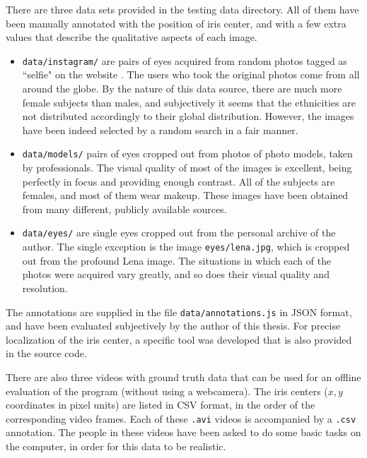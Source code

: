 There are three data sets provided in the testing data directory.
All of them have been manually annotated with the position of iris center, and with a few extra values that describe the qualitative aspects of each image.

\begin{itemize}
\item {\tt data/instagram/} are pairs of eyes acquired from random photos tagged as ``selfie" on the website .
The users who took the original photos come from all around the globe.
By the nature of this data source, there are much more female subjects than males, and subjectively it seems that the ethnicities are not distributed accordingly to their global distribution.
However, the images have been indeed selected by a random search in a fair manner.

\item {\tt data/models/} pairs of eyes cropped out from photos of photo models, taken by professionals.
The visual quality of most of the images is excellent, being perfectly in focus and providing enough contrast.
All of the subjects are females, and most of them wear makeup.
These images have been obtained from many different, publicly available sources.

\item {\tt data/eyes/} are single eyes cropped out from the personal archive of the author.
The single exception is the image {\tt eyes/lena.jpg}, which is cropped out from the profound Lena image.
The situations in which each of the photos were acquired vary greatly, and so does their visual quality and resolution.
\end{itemize}

The annotations are supplied in the file {\tt data/annotations.js} in JSON format, and have been evaluated subjectively by the author of this thesis.
For precise localization of the iris center, a specific tool was developed that is also provided in the source code.

There are also three videos with ground truth data that can be used for an offline evaluation of the program (without using a webcamera).
The iris centers ($x, y$ coordinates in pixel units) are listed in CSV format, in the order of the corresponding video frames.
Each of these {\tt .avi} videos is accompanied by a {\tt .csv} annotation.
The people in these videos have been asked to do some basic tasks on the computer, in order for this data to be realistic.

